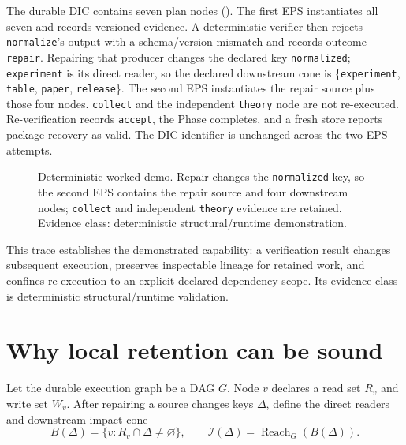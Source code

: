 \documentclass{article}
\newcommand{\Reach}{\operatorname{Reach}}
\begin{document}
The durable DIC contains seven plan nodes (). The first EPS instantiates all seven and records versioned evidence. A deterministic verifier then rejects \texttt{normalize}'s output with a schema/version mismatch and records outcome \texttt{repair}. Repairing that producer changes the declared key \texttt{normalized}; \texttt{experiment} is its direct reader, so the declared downstream cone is \{\texttt{experiment}, \texttt{table}, \texttt{paper}, \texttt{release}\}. The second EPS instantiates the repair source plus those four nodes. \texttt{collect} and the independent \texttt{theory} node are not re-executed. Re-verification records \texttt{accept}, the Phase completes, and a fresh store reports package recovery as valid. The DIC identifier is unchanged across the two EPS attempts.

\begin{figure}[t]
\centering
{}
\caption{Deterministic worked demo. Repair changes the \texttt{normalized} key, so the second EPS contains the repair source and four downstream nodes; \texttt{collect} and independent \texttt{theory} evidence are retained. Evidence class: deterministic structural/runtime demonstration.}
\label{fig:demo}
\end{figure}

This trace establishes the demonstrated capability: a verification result changes subsequent execution, preserves inspectable lineage for retained work, and confines re-execution to an explicit declared dependency scope. Its evidence class is deterministic structural/runtime validation.

\section{Why local retention can be sound}
Let the durable execution graph be a DAG $G$. Node $v$ declares a read set $R_v$ and write set $W_v$. After repairing a source changes keys $\Delta$, define the direct readers and downstream impact cone
\[
B(\Delta)=\{v:R_v\cap\Delta\neq\varnothing\},\qquad
\mathcal I(\Delta)=\Reach_G(B(\Delta)).
\]
\end{document}
